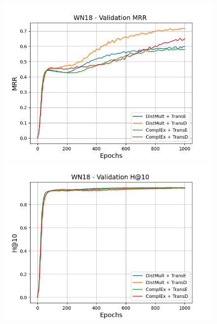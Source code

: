 \begin{figure}
    \centering
    \begin{minipage}{.5\textwidth}
      \centering
      \includegraphics[width=\linewidth]{figures/results/gan_train/not_pretrained/random/wn18/epochs1000/random_wn18_mrrs.png}
    \end{minipage}%
    \begin{minipage}{.5\textwidth}
      \centering
      \includegraphics[width=\linewidth]{figures/results/gan_train/not_pretrained/random/wn18/epochs1000/random_wn18_hit10.png}
    \end{minipage}
    

\end{figure}
